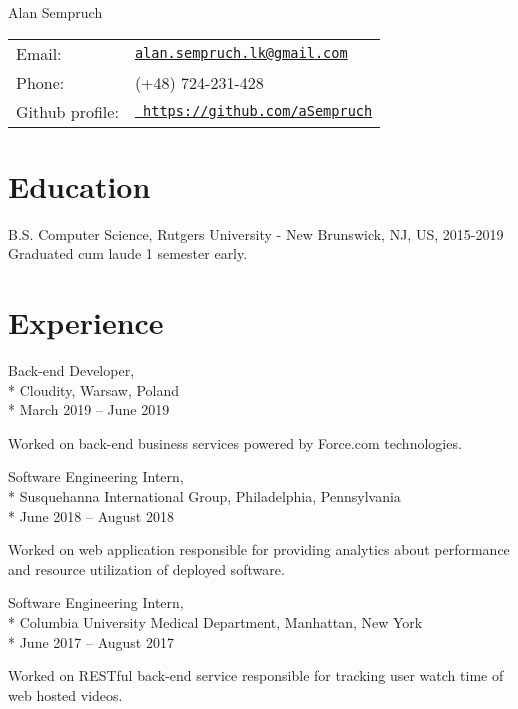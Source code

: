 \documentclass[letterpaper]{article}
\def\name{Alan Sempruch}
\renewenvironment{itemize}{
  \begin{list}{}{
      \setlength{\leftmargin}{1.5em}
    }
  }{
  \end{list}
}
\begin{document}
{\huge \name}


\vspace{0.20in}
\begin{minipage}{0.45\linewidth}
  \begin{tabular}{ll}
    Email: & \href{mailto:alan.sempruch.lk@gmail.com}{\tt alan.sempruch.lk@gmail.com} \\
    Phone: & (+48) 724-231-428 \\
    Github profile: & \href{https://github.com/aSempruch}{\tt
      https://github.com/aSempruch} 
  \end{tabular}
\end{minipage}

\section*{Education}

\begin{itemize}
\item B.S. Computer Science, Rutgers University - New Brunswick, NJ, US, 2015-2019 \\
Graduated cum laude 1 semester early.
\end{itemize}

\section*{Experience}
\begin{itemize}

\item
  \begin{flushleft}
    Back-end Developer,\\*
    Cloudity, Warsaw, Poland\\*
    March 2019 -- June 2019

    Worked on back-end business services powered by Force.com technologies.
  \end{flushleft}

\item
  \begin{flushleft}
    Software Engineering Intern,\\*
    Susquehanna International Group, Philadelphia, Pennsylvania\\*
    June 2018 -- August 2018

    Worked on web application responsible for providing analytics 
    about performance and resource utilization of deployed software.
  \end{flushleft}

\item
  \begin{flushleft}
    Software Engineering Intern,\\*
    Columbia University Medical Department, Manhattan, New York\\*
    June 2017 -- August 2017

    Worked on RESTful back-end service responsible for tracking user watch time of web hosted videos.
  \end{flushleft}
\end{itemize}
\end{document}
